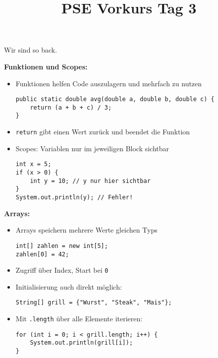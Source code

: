\documentclass{../../sheet}
\title{PSE Vorkurs Tag 3}
\begin{document}
\maketitle
Wir sind so back.

\textbf{Funktionen und Scopes:}
	\begin{itemize}
		\item Funktionen helfen Code auszulagern und mehrfach zu nutzen
		      \begin{verbatim}
public static double avg(double a, double b, double c) {
    return (a + b + c) / 3;
}
          \end{verbatim}
		\item \texttt{return} gibt einen Wert zurück und beendet die Funktion
		\item Scopes: Variablen nur im jeweiligen Block sichtbar
		      \begin{verbatim}
int x = 5;
if (x > 0) {
    int y = 10; // y nur hier sichtbar
}
System.out.println(y); // Fehler!
          \end{verbatim}
	\end{itemize}

    \textbf{Arrays:}
	
	\begin{itemize}
		\item Arrays speichern mehrere Werte gleichen Typs
		      \begin{verbatim}
int[] zahlen = new int[5];
zahlen[0] = 42;
          \end{verbatim}
		\item Zugriff über Index, Start bei \texttt{0}
		\item Initialisierung auch direkt möglich:
		      \begin{verbatim}
String[] grill = {"Wurst", "Steak", "Mais"};
          \end{verbatim}
		\item Mit \texttt{.length} über alle Elemente iterieren:
		      \begin{verbatim}
for (int i = 0; i < grill.length; i++) {
    System.out.println(grill[i]);
}
          \end{verbatim}
	\end{itemize}


\newpage

\end{document}
